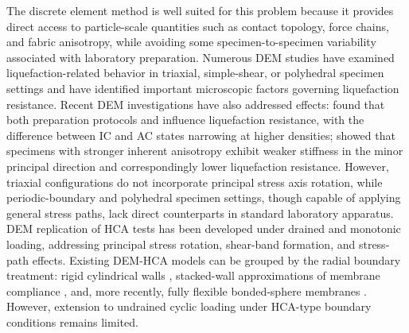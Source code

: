 The discrete element method \citep[DEM;][]{Cundall1979} is well suited for this problem because it provides direct access to particle-scale quantities such as contact topology, force chains, and fabric anisotropy, while avoiding some specimen-to-specimen variability associated with laboratory preparation. Numerous DEM studies have examined liquefaction-related behavior in triaxial, simple-shear, or polyhedral specimen settings \citep[e.g.,][]{Huang2018,Yang2021,Jiang2021,Morimoto2021,WuYang2022,Xie2023,YangHuang2023,Zhang2023} and have identified important microscopic factors governing liquefaction resistance. Recent DEM investigations have also addressed \Kzero{} effects: \citet{YangTaiebat2024} found that both preparation protocols and \Kzero{} influence liquefaction resistance, with the difference between IC and AC states narrowing at higher densities; \citet{Otsubo2022} showed that specimens with stronger inherent anisotropy exhibit weaker stiffness in the minor principal direction and correspondingly lower liquefaction resistance. However, triaxial configurations do not incorporate principal stress axis rotation, while periodic-boundary and polyhedral specimen settings, though capable of applying general stress paths, lack direct counterparts in standard laboratory apparatus. DEM replication of HCA tests has been developed under drained and monotonic loading, addressing principal stress rotation, shear-band formation, and stress-path effects. Existing DEM-HCA models can be grouped by the radial boundary treatment: rigid cylindrical walls \citep{Shi2021,Liu2021}, stacked-wall approximations of membrane compliance \citep{LiGuoZhang2014,LiZhangGutierrez2015,LiChenGutierrez2017}, and, more recently, fully flexible bonded-sphere membranes \citep{Song2024,Song2024suffusion}. However, extension to undrained cyclic loading under HCA-type boundary conditions remains limited.

